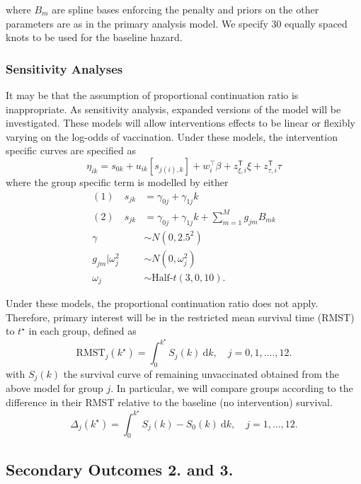 \documentclass[
  bibliography=totoc]{scrreprt}
\begin{document}
where \(B_m\) are spline bases enforcing the penalty and priors on the other parameters are as in the primary analysis model.
We specify 30 equally spaced knots to be used for the baseline hazard.

\hypertarget{sensitivity-analyses}{%
\subsubsection{Sensitivity Analyses}\label{sensitivity-analyses}}

It may be that the assumption of proportional continuation ratio is inappropriate.
As sensitivity analysis, expanded versions of the model will be investigated.
These models will allow interventions effects to be linear or flexibly varying on the log-odds of vaccination.
Under these models, the intervention specific curves are specified as
\[
\eta_{ik} = s_{0k} + u_{ik}\left[s_{j(i),k}\right] + w_i^\top\beta + z^\mathsf{T}_{\xi,i}\xi + z^\mathsf{T}_{\tau,i}\tau
\]
where the group specific term is modelled by either
\[
\begin{aligned}
(1)\quad s_{jk} &= \gamma_{0j} + \gamma_{1j}k \\
(2)\quad s_{jk} &= \gamma_{0j} + \gamma_{1j}k + \textstyle\sum_{m=1}^M g_{jm} B_{mk} \\
\gamma &\sim N(0,2.5^2) \\
g_{jm}|\omega_j^2 &\sim N(0, \omega_j^2) \\
\omega_j &\sim \text{Half-}t(3, 0, 10).
\end{aligned}
\]

Under these models, the proportional continuation ratio does not apply.
Therefore, primary interest will be in the restricted mean survival time (RMST) \citep{royston2011, royston2013} to \(t^\star\) in each group, defined as
\[
\text{RMST}_j(k^\star) = \int_0^{k^\star} S_j(k)\ \mathrm dk,\quad j=0,1,....,12.
\]
with \(S_j(k)\) the survival curve of remaining unvaccinated obtained from the above model for group \(j\).
In particular, we will compare groups according to the difference in their RMST relative to the baseline (no intervention) survival.
\[
\Delta_j(k^\star) = \int_0^{k^\star} S_j(k) - S_0(k)\ \mathrm dk,\quad j=1,...,12.
\]

\hypertarget{secondary-outcomes-2.-and-3.}{%
\subsection{Secondary Outcomes 2. and 3.}\label{secondary-outcomes-2.-and-3.}}
\end{document}
